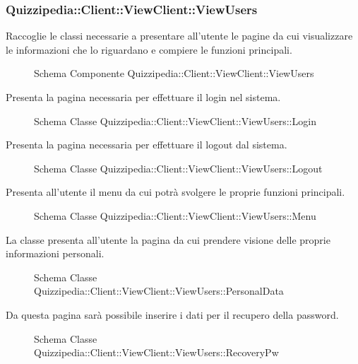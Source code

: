 \subsubsection{Quizzipedia::Client::ViewClient::ViewUsers}
Raccoglie le classi necessarie a presentare all'utente le pagine da cui visualizzare le informazioni che lo riguardano e compiere le funzioni principali.
\begin{figure}[H]
\centering
\noindent{}
\caption{Schema Componente Quizzipedia::Client::ViewClient::ViewUsers}
\end{figure}
Presenta la pagina necessaria per effettuare il login nel sistema.
\begin{figure}[H]
\centering
\noindent{}
\caption{Schema Classe Quizzipedia::Client::ViewClient::ViewUsers::Login}
\end{figure}
Presenta la pagina necessaria per effettuare il logout dal sistema.
\begin{figure}[H]
\centering
\noindent{}
\caption{Schema Classe Quizzipedia::Client::ViewClient::ViewUsers::Logout}
\end{figure}
Presenta all'utente il menu da cui potrà svolgere le proprie funzioni principali.
\begin{figure}[H]
\centering
\noindent{}
\caption{Schema Classe Quizzipedia::Client::ViewClient::ViewUsers::Menu}
\end{figure}
La classe presenta all'utente la pagina da cui prendere visione delle proprie informazioni personali.
\begin{figure}[H]
\centering
\noindent{}
\caption{Schema Classe Quizzipedia::Client::ViewClient::ViewUsers::PersonalData}
\end{figure}
Da questa pagina sarà possibile inserire i dati per il recupero della password.
\begin{figure}[H]
\centering
\noindent{}
\caption{Schema Classe Quizzipedia::Client::ViewClient::ViewUsers::RecoveryPw}
\end{figure}
